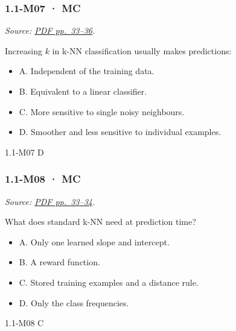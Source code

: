 \noindent\begin{minipage}{\linewidth}

\subsubsection{1.1-M07 · MC}\label{m07-mc}

\emph{Source:
\href{../Lecture\%20Slides/1.1.\%20Fundamentals.pdf\#page=33}{PDF
pp.~33--36}.}

Increasing \(k\) in k-NN classification usually makes predictions:

\begin{itemize}
\tightlist
\item
  A. Independent of the training data.
\item
  B. Equivalent to a linear classifier.
\item
  C. More sensitive to single noisy neighbours.
\item
  D. Smoother and less sensitive to individual examples.
\end{itemize}

\begin{solution}[8mm]{1.1-M07}
D
\end{solution}
\end{minipage}\par\medskip

\noindent\begin{minipage}{\linewidth}

\subsubsection{1.1-M08 · MC}\label{m08-mc}

\emph{Source:
\href{../Lecture\%20Slides/1.1.\%20Fundamentals.pdf\#page=33}{PDF
pp.~33--34}.}

What does standard k-NN need at prediction time?

\begin{itemize}
\tightlist
\item
  A. Only one learned slope and intercept.
\item
  B. A reward function.
\item
  C. Stored training examples and a distance rule.
\item
  D. Only the class frequencies.
\end{itemize}

\begin{solution}[8mm]{1.1-M08}
C
\end{solution}
\end{minipage}\par\medskip

